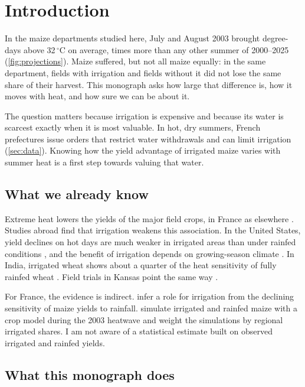 \section{Introduction}
\label{sec:introduction}

In the maize departments studied here, July and August 2003 brought \HeatTwoThousandThree{} degree-days above 32\,$^{\circ}$C on average, \HeatRatio{} times more than any other summer of 2000--2025 (\cref{fig:projections}). Maize suffered, but not all maize equally: in the same department, fields with irrigation and fields without it did not lose the same share of their harvest. This monograph asks how large that difference is, how it moves with heat, and how sure we can be about it.

The question matters because irrigation is expensive and because its water is scarcest exactly when it is most valuable. In hot, dry summers, French prefectures issue orders that restrict water withdrawals and can limit irrigation (\cref{sec:data}). Knowing how the yield advantage of irrigated maize varies with summer heat is a first step towards valuing that water.

\subsection*{What we already know}

Extreme heat lowers the yields of the major field crops, in France as elsewhere \parencite{schlenker2009,gammans2017}. Studies abroad find that irrigation weakens this association. In the United States, yield declines on hot days are much weaker in irrigated areas than under rainfed conditions \parencite{schauberger2017}, and the benefit of irrigation depends on growing-season climate \parencite{li2018}. In India, irrigated wheat shows about a quarter of the heat sensitivity of fully rainfed wheat \parencite{zaveri2019}. Field trials in Kansas point the same way \parencite{tack2017}.

For France, the evidence is indirect. \textcite{hawkins2013} infer a role for irrigation from the declining sensitivity of maize yields to rainfall. \textcite{vandervelde2010} simulate irrigated and rainfed maize with a crop model during the 2003 heatwave and weight the simulations by regional irrigated shares. I am not aware of a statistical estimate built on observed irrigated and rainfed yields.

\subsection*{What this monograph does}

